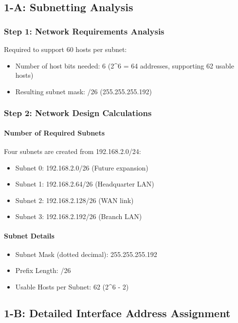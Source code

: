 \documentclass[12pt]{article}
\begin{document}
\subsection{1-A: Subnetting Analysis}
\subsubsection{Step 1: Network Requirements Analysis}
Required to support 60 hosts per subnet:
\begin{itemize}
    \item Number of host bits needed: 6 (2\^{}6 = 64 addresses, supporting 62 usable hosts)
    \item Resulting subnet mask: /26 (255.255.255.192)
\end{itemize}

\subsubsection{Step 2: Network Design Calculations}
\paragraph{Number of Required Subnets}
Four subnets are created from 192.168.2.0/24:
\begin{itemize}
    \item Subnet 0: 192.168.2.0/26 (Future expansion)
    \item Subnet 1: 192.168.2.64/26 (Headquarter LAN)
    \item Subnet 2: 192.168.2.128/26 (WAN link)
    \item Subnet 3: 192.168.2.192/26 (Branch LAN)
\end{itemize}

\paragraph{Subnet Details}
\begin{itemize}
    \item Subnet Mask (dotted decimal): 255.255.255.192
    \item Prefix Length: /26
    \item Usable Hosts per Subnet: 62 (2\^{}6 - 2)
\end{itemize}

\subsection{1-B: Detailed Interface Address Assignment}
\end{document}

